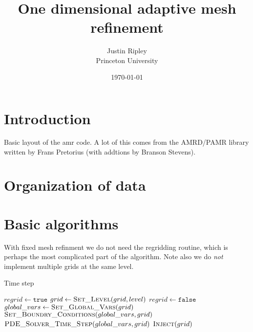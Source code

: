 \documentclass[10pt,letter]{article}
\begin{document}
\title{One dimensional adaptive mesh refinement}    
\author{Justin Ripley
	\\Princeton University}
\date{\today}
 
\maketitle 
     
\section{Introduction}
       Basic layout of the amr code. A lot of this comes from the AMRD/PAMR
library written by Frans Pretorius (with addtions by Branson Stevens).  

\section{Organization of data}

\section{Basic algorithms}

	With fixed mesh refinment we do not need the regridding routine,
which is perhaps the most complicated part of the algorithm. Note also
we do \emph{not} implement multiple grids at the same level.

\begin{algorithm}
\caption{Time step}\label{alg:time_step}
\begin{algorithmic}[1]
	\State$regrid\gets \texttt{true}$
		\State$grid\gets\Call{Set\_Level}{grid,level}$
			\State{}
			\State$regrid\gets \texttt{false}$
		\EndIf 
		\State$global\_vars\gets\Call{Set\_Global\_Vars}{grid}$
		\State$\Call{Set\_Boundry\_Conditions}{global\_vars,grid}$
		\State$\Call{PDE\_Solver\_Time\_Step}{global\_vars,grid}$
	\EndFor
	\State$\Call{Inject}{grid}$
\EndProcedure
\end{algorithmic}
\end{algorithm}
\end{document}
